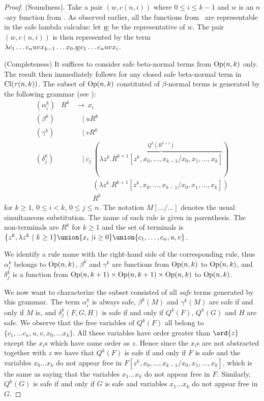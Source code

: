 \begin{proof}
  (Soundness). Take a pair $(w,c(n,i))$ where
  $0\leq i\leq k-1$ and $w$ is an $n$-ary function from \safedefset.
  As observed earlier, all the functions from \safedefset\ are representable
  in the safe lambda calculus: let $\underline{w}$ be the representative of $w$.
  The pair $(w,c(n,i))$ is then represented by the term
  $ \lambda c_1 \ldots c_n u v x_{k-1} \ldots x_0 . \underline{w} c_1\ldots c_n u v x_i$.
\smallskip

(Completeness) It suffices to consider safe beta-normal terms from
${\rm Op}(n,k)$ only. The result then immediately follows for any
closed safe beta-normal term in ${\rm Cl}(\tau(n,k))$. The subset
of ${\rm Op}(n,k)$ constituted of $\beta$-normal terms is
generated by the following grammar (see
\cite{DBLP:journals/tcs/Zaionc87}):
\begin{eqnarray*}
  (\alpha_i^k) &R^k &\rightarrow\ x_i \\
  (\beta^k) && \quad|\  u R^k \\
  (\gamma^k) && \quad|\  v R^k \\
  (\delta^k_j) && \quad|\  c_j\ (\overbrace{\lambda z^k. R^{k+1}[z^k,x_0,\ldots, x_{k-1}/x_0,x_1, \ldots, x_k]}^{Q^k(R^{k+1})}) \\
  && \quad\  \quad \ (\lambda z^k. R^{k+1}[z^k,x_0,\ldots, x_{k-1}/x_0,x_1, \ldots, x_k]) \\
  && \quad\  \quad \ R^k
\end{eqnarray*}
for $k\geq 1$, $0\leq i< k$, $0\leq j\leq n$. The notation
$M[\ldots/\ldots]$ denotes the usual simultaneous substitution. The
name of each rule is given in parenthesis. The non-terminals are
$R^k$ for $k\geq1$ and the set of terminals is $\{ z^k, \lambda z^k
\ |\ k\geq 1\} \union \{ x_i ~| i\geq 0 \} \union \{ c_1, \ldots,
c_n, u, v \}$.

We identify a rule name with the right-hand side of the
corresponding rule, thus $\alpha_i^k$ belongs to ${\rm Op}(n,k)$,
$\beta^k$ and $\gamma^k$ are functions from ${\rm Op}(n,k)$ to
${\rm Op}(n,k)$, and $\delta^k_j$ is a function from
${\rm Op}(n,k+1) \times {\rm Op}(n,k+1) \times {\rm Op}(n,k)$
to ${\rm Op}(n,k)$.

We now want to characterize the subset consisted of all \emph{safe}
terms generated by this grammar. The term $\alpha_i^k$ is always
safe, $\beta^k(M)$ and $\gamma^k(M)$ are safe if and only if $M$ is,
and  $\delta^k_j(F,G,H)$ is safe if and only if $Q^k(F)$, $Q^k(G)$
and $H$ are safe. We observe that the free variables of $Q^k(F)$ all
belong to $\{ c_1, \ldots c_n, u, v, x_0,\ldots x_{k}\}$. All these
variables have order greater than $\ord{z}$ except the $x_i$s which
have same order as $z$. Hence since the $x_i$s are not abstracted
together with $z$ we have that $Q^k(F)$ is safe if and only if $F$
is safe and the variables $x_0\ldots x_k$ do not appear free in
$F[z^k,x_0,\ldots, x_{k-1}/x_0,x_1, \ldots, x_k]$, which is the same
as saying that the variables $x_1\ldots x_k$ do not appear free in
$F$. Similarly, $Q^k(G)$ is safe if and only if $G$ is safe and
variables $x_1\ldots x_k$ do not appear free in $G$.


\end{proof}
